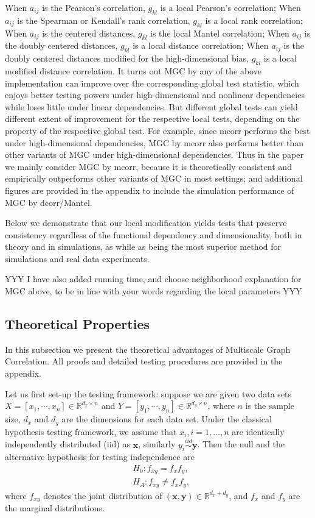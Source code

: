 \documentclass[11pt]{article}
\providecommand{\mb}[1]{\boldsymbol{#1}}
\newcommand{\Real}{\mathbb{R}}
\begin{document}
When $a_{ij}$ is the Pearson's correlation, $g_{kl}$ is a local Pearson's correlation;
When $a_{ij}$ is the Spearman or Kendall's rank correlation, $g_{kl}$ is a local rank correlation;
When $a_{ij}$ is the centered distances, $g_{kl}$ is the local Mantel correlation;
When $a_{ij}$ is the doubly centered distances, $g_{kl}$ is a local distance correlation;
When $a_{ij}$ is the doubly centered distances modified for the high-dimensional bias, $g_{kl}$ is a local modified distance correlation.  
It turns out MGC by any of the above implementation can improve over the corresponding global test statistic, which enjoys better testing powers under high-dimensional and nonlinear dependencies while loses little under linear dependencies. But different global tests can yield different extent of improvement for the respective local tests, depending on the property of the respective global test. For example, since mcorr performs the best under high-dimensional dependencies, MGC by mcorr also performs better than other variants of MGC under high-dimensional dependencies. Thus in the paper we mainly consider MGC by mcorr, because it is theoretically consistent and empirically outperforms other variants of MGC in most settings; and additional figures are provided in the appendix to include the simulation performance of MGC by dcorr/Mantel. 

Below we demonstrate that our local modification yields tests that preserve consistency regardless of the functional dependency and dimensionality, both in theory and in simulations, as while as being the most superior method for simulations and real data experiments.

YYY I have also added running time, and choose neighborhood explanation for MGC above, to be in line with your words regarding the local parameters YYY

\subsection{Theoretical Properties}
\label{main4}
In this subsection we present the theoretical advantages of Multiscale Graph Correlation. All proofs and detailed testing procedures are provided in the appendix. 

Let us first set-up the testing framework: suppose we are given two data sets $X=[x_{1},\cdots, x_{n}] \in \Real^{d_{x} \times n}$ and $Y=[y_{1},\cdots, y_{n}] \in \Real^{d_{y} \times n}$, where $n$ is the sample size, $d_{x}$ and $d_{y}$ are the dimensions for each data set. Under the classical hypothesis testing framework, we assume that $x_{i}, i=1,\ldots,n$ are identically independently distributed (iid) as $\mb{x}$, similarly $y_{i} \stackrel{iid}{\sim} \mb{y}$. Then the null and the alternative hypothesis for testing independence are
\begin{align*}
& H_{0}: f_{xy}=f_{x}f_{y},\\
& H_{A}: f_{xy} \neq f_{x}f_{y},
\end{align*}
where $f_{xy}$ denotes the joint distribution of $(\mb{x},\mb{y}) \in \Real^{d_{x} + d_{y}}$, and $f_{x}$ and $f_{y}$ are the marginal distributions. 
\end{document}
